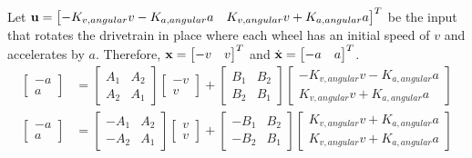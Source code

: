 Let $\mathbf{u} =
\begin{bmatrix}
  -K_{v,angular} v - K_{a,angular} a & K_{v,angular} v + K_{a,angular} a
\end{bmatrix}^T$ be the input that rotates the drivetrain in place where each
wheel has an initial speed of $v$ and accelerates by $a$. Therefore, $\mathbf{x} =
\begin{bmatrix}
  -v & v
\end{bmatrix}^T$ and $\dot{\mathbf{x}} =
\begin{bmatrix}
  -a & a
\end{bmatrix}^T$.
\begin{align*}
  \begin{bmatrix}
    -a \\
    a
  \end{bmatrix} &=
    \begin{bmatrix}
      A_1 & A_2 \\
      A_2 & A_1
    \end{bmatrix}
    \begin{bmatrix}
      -v \\
      v
    \end{bmatrix} +
    \begin{bmatrix}
      B_1 & B_2 \\
      B_2 & B_1
    \end{bmatrix}
    \begin{bmatrix}
      -K_{v,angular} v - K_{a,angular} a \\
      K_{v,angular} v + K_{a,angular} a
    \end{bmatrix} \\
  \begin{bmatrix}
    -a \\
    a
  \end{bmatrix} &=
    \begin{bmatrix}
      -A_1 & A_2 \\
      -A_2 & A_1
    \end{bmatrix}
    \begin{bmatrix}
      v \\
      v
    \end{bmatrix} +
    \begin{bmatrix}
      -B_1 & B_2 \\
      -B_2 & B_1
    \end{bmatrix}
    \begin{bmatrix}
      K_{v,angular} v + K_{a,angular} a \\
      K_{v,angular} v + K_{a,angular} a

\end{bmatrix}
\end{align*}
